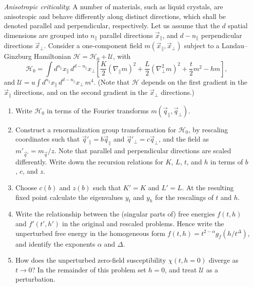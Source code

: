 \begin{problem}
    \textit{Anisotropic criticality}: A number of materials, such as liquid crystals, are anisotropic and behave differently along distinct directions, which shall be denoted parallel and perpendicular, respectively. Let us assume that the $d$ spatial dimensions are grouped into $n_\parallel$ parallel directions $\vec{x}_\parallel$, and $d - n_\parallel$ perpendicular directions $\vec{x}_\perp$. Consider a one-component field $m(\vec{x}_\parallel, \vec{x}_\perp)$ subject to a Landau--Ginzburg Hamiltonian $\mathcal{H} = \mathcal{H}_0 + \mathcal{U}$, with
    \[
        \mathcal{H}_0 = \int d^{n_\parallel}x_\parallel\,d^{d-n_\parallel}x_\perp\left[\frac{K}{2}(\nabla_\parallel m)^2 + \frac{L}{2}(\nabla_\perp^2 m)^2 + \frac{t}{2}m^2 - hm\right],
    \]
    and $\mathcal{U} = u\int d^{n_\parallel}x_\parallel\,d^{d-n_\parallel}x_\perp\,m^4$. (Note that $\mathcal{H}$ depends on the first gradient in the $\vec{x}_\parallel$ directions, and on the second gradient in the $\vec{x}_\perp$ directions.)

    \begin{enumerate}
        \item[(a)] Write $\mathcal{H}_0$ in terms of the Fourier transforms $m(\vec{q}_\parallel, \vec{q}_\perp)$.

        \item[(b)] Construct a renormalization group transformation for $\mathcal{H}_0$, by rescaling coordinates such that $\vec{q}'_\parallel = b\vec{q}_\parallel$ and $\vec{q}'_\perp = c\vec{q}_\perp$, and the field as $m'_{\vec{q}'} = m_{\vec{q}}/z$. Note that parallel and perpendicular directions are scaled differently. Write down the recursion relations for $K$, $L$, $t$, and $h$ in terms of $b$, $c$, and $z$.

        \item[(c)] Choose $c(b)$ and $z(b)$ such that $K' = K$ and $L' = L$. At the resulting fixed point calculate the eigenvalues $y_t$ and $y_h$ for the rescalings of $t$ and $h$.

        \item[(d)] Write the relationship between the (singular parts of) free energies $f(t,h)$ and $f'(t',h')$ in the original and rescaled problems. Hence write the unperturbed free energy in the homogeneous form $f(t,h) = t^{2-\alpha}g_f(h/t^\Delta)$, and identify the exponents $\alpha$ and $\Delta$.

        \item[(e)] How does the unperturbed zero-field susceptibility $\chi(t, h=0)$ diverge as $t \to 0$? In the remainder of this problem set $h = 0$, and treat $\mathcal{U}$ as a perturbation.


\end{enumerate}
\end{problem}
